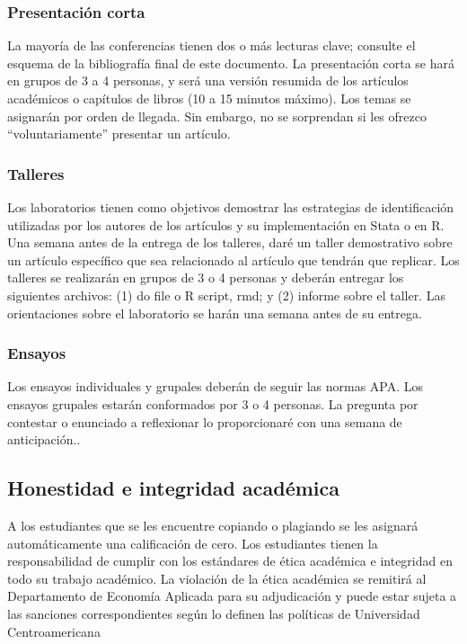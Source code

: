 \documentclass[12]{article}
\begin{document}
\subsubsection*{Presentación corta}

La mayoría de las conferencias tienen dos o más lecturas clave; consulte el esquema de la bibliografía final de este
documento. La presentación corta se hará en grupos de 3 a 4 personas, y será una versión resumida de los artículos
académicos o capítulos de libros (10 a 15 minutos máximo). Los temas se asignarán por orden de llegada. Sin embargo, no
se sorprendan si les ofrezco “voluntariamente” presentar un artículo.

\vspace{-0.25cm}
\subsubsection*{Talleres}

Los laboratorios tienen como objetivos demostrar las estrategias de identificación utilizadas por los autores de los artículos
y su implementación en Stata o en R. Una semana antes de la entrega de los talleres, daré un taller demostrativo sobre un
artículo específico que sea relacionado al artículo que tendrán que replicar. Los talleres se realizarán en grupos de 3 o 4
personas y deberán entregar los siguientes archivos: (1) do file o R script, rmd; y (2) informe sobre el taller. Las orientaciones
sobre el laboratorio se harán una semana antes de su entrega.

\vspace{-0.25cm}
\subsubsection*{Ensayos}

Los ensayos individuales y grupales deberán de seguir las normas APA. Los ensayos grupales estarán conformados por 3
o 4 personas. La pregunta por contestar o enunciado a reflexionar lo proporcionaré con una semana de anticipación.. 

\subsection*{Honestidad e integridad académica}

A los estudiantes que se les encuentre copiando o plagiando se les asignará automáticamente una calificación de cero. Los
estudiantes tienen la responsabilidad de cumplir con los estándares de ética académica e integridad en todo su trabajo
académico. La violación de la ética académica se remitirá al Departamento de Economía Aplicada para su adjudicación y
puede estar sujeta a las sanciones correspondientes según lo definen las políticas de Universidad Centroamericana
\end{document}
